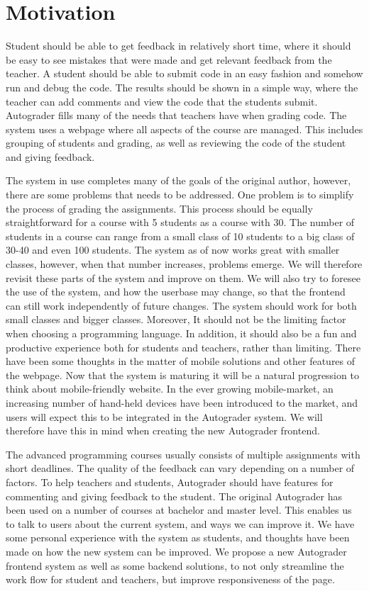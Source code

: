 \chapter*{Motivation}

Student should be able to get feedback in relatively short time, where it should be easy to see mistakes that were made and get relevant feedback from the teacher. A student should be able to submit code in an easy fashion and somehow run and debug the code. The results should be shown in a simple way, where the teacher can add comments and view the code that the students submit. Autograder fills many of the needs that teachers have when grading code. The system uses a webpage where all aspects of the course are managed. This includes grouping of students and grading, as well as reviewing the code of the student and giving feedback. 


The system in use completes many of the goals of the original author, however, there are some problems that needs to be addressed. One problem is to simplify the process of grading the assignments. This process should be equally straightforward for a course with 5 students as a course with 30. The number of students in a course can range from a small class of 10 students to a big class of 30-40 and even 100 students. The system as of now works great with smaller classes, however, when that number increases, problems emerge. We will therefore revisit these parts of the system and improve on them. We will also try to foresee the use of the system, and how the userbase may change, so that the frontend can still work independently of future changes. The system should work for both small classes and bigger classes. Moreover, It should not be the limiting factor when choosing a programming language. In addition, it should also be a fun and productive experience both for students and teachers, rather than limiting. There have been some thoughts in the matter of mobile solutions and other features of the webpage. Now that the system is maturing it will be a natural progression to think about mobile-friendly website. In the ever growing mobile-market, an increasing number of hand-held devices have been introduced to the market, and users will expect this to be integrated in the Autograder system. We will therefore have this in mind when creating the new Autograder frontend.

The advanced programming courses usually consists of multiple assignments with short deadlines. The quality of the feedback can vary depending on a number of factors. To help teachers and students, Autograder should have features for commenting and giving feedback to the student. The original Autograder has been used on a number of courses at bachelor and master level. This enables us to talk to users about the current system, and ways we can improve it. We have some personal experience with the system as students, and thoughts have been made on how the new system can be improved. We propose a new Autograder frontend system as well as some backend solutions, to not only streamline the work flow for student and teachers, but improve responsiveness of the page.
